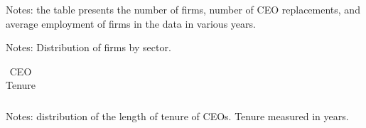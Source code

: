 \documentclass[sigconf,nonacm]{acmart}
\newcommand{\tablepath}{papers/econometrics/table}
\begin{document}
\renewcommand{\thefigure}{B\arabic{figure}} 
\renewcommand{\thetable}{B\arabic{table}}
\setcounter{figure}{0}
\setcounter{table}{0}


\begin{table}[h]
    \centering
    \caption{Company-Year Characteristics}
    \vspace{.2cm}
    \label{tab:year_desc}
    
    \begin{minipage}{\columnwidth}
    \vspace{.2cm}
    \footnotesize{Notes: the table presents the number of firms, number of CEO replacements, and average employment of firms in the data in various years.}
    \end{minipage}
\end{table}
\vspace{.5cm}


\begin{table}[h]
    \centering
    \caption{Industrial Distribution of Firms}
    \vspace{.2cm}
    \label{tab:industry_desc}
    
    \begin{minipage}{\columnwidth}
    \vspace{.2cm}
    \footnotesize{\hspace{1.8cm} Notes: Distribution of firms by sector.}
    \end{minipage}
\end{table}
\vspace{.5cm}


\begin{table}[h]
    \centering
    \caption{CEO Tenure}
    \vspace{.2cm}
    \label{tab:tenure_desc}
    \begin{tabular}{lcccc}
    
    \end{tabular}
    \begin{minipage}{8cm}
    \vspace{.2cm}
    \footnotesize{Notes: distribution of the length of tenure of CEOs. Tenure measured in years.}
    \end{minipage}
\end{table}
\vspace{.5cm}
\end{document}
